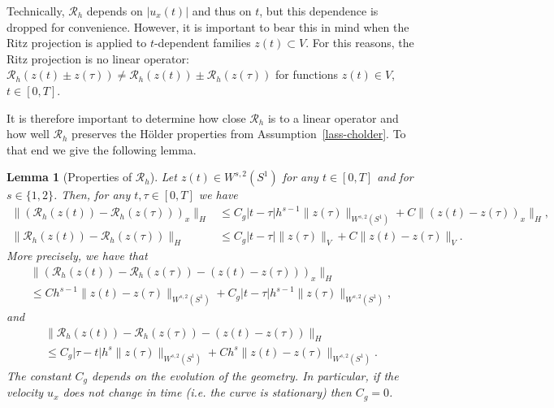 \documentclass[a4paper,10pt]{article}
\newtheorem{lemma}[cor]{Lemma}
\numberwithin{equation}{section}
\begin{document}
Technically, $\mathcal{R}_{h}$ depends on $|u_{x}(t)|$ and thus on $t$, but this dependence is dropped for convenience. However, it is important to bear this in mind when the Ritz projection is applied to $t$-dependent families $z(t) \subset V$. For this reasons, the Ritz projection is no linear operator: $\mathcal{R}_{h}(z(t) \pm z(\tau)) \neq \mathcal{R}_{h}(z(t)) \pm \mathcal{R}_{h}(z(\tau))$ for functions $z(t) \in V$, $t \in [0,T]$.

It is therefore important to determine how close $\mathcal{R}_{h}$ is to a linear operator and how well $\mathcal{R}_{h}$ preserves the H\"older properties from Assumption~\ref{lass-cholder}. To that end we give the following lemma.

\begin{lemma}[Properties of $\mathcal{R}_{h}$]
Let $z(t) \in W^{s,2}(S^{1})$ for any $t \in [0,T]$ and for $s \in \{ 1,2 \}$. Then, for any $t, \tau \in [0,T]$ we have
\begin{align}
\label{RH1}
 \| (\mathcal{R}_{h} (z(t)) -\mathcal{R}_{h} (z(\tau)) )_{x} \|_{H}& \leq C_{g} |t -\tau| h^{s-1}\| z(\tau)\|_{W^{s,2}(S^{1})} + C \| (z(t) -z(\tau) )_{x} \|_{H},\\
 \label{RH2}
 \| \mathcal{R}_{h} (z(t)) -\mathcal{R}_{h} (z(\tau)) \|_{H}& \leq C_{g} |t -\tau| \| z(\tau)\|_{V}+
 C\| z(t) -z(\tau) \|_{V}.
\end{align}
More precisely, we have that
\begin{multline}\label{RH3}
\| (\mathcal{R}_{h} (z(t)) -\mathcal{R}_{h} (z(\tau)) - (z(t) -z(\tau)) )_{x}\|_{H} \\
\leq Ch^{s-1}
\| z(t) -z(\tau)\|_{W^{s,2}(S^{1})} + C_{g} |t -\tau|h^{s-1}
\| z(\tau)\|_{W^{s,2}(S^{1})} ,
\end{multline}
and 
\begin{multline}\label{RH4}
\| \mathcal{R}_{h} (z(t)) -\mathcal{R}_{h} (z(\tau)) - (z(t) -z(\tau)) \|_{H} \\
 \leq C_{g}|\tau-t|h^{s}\| z(\tau)\|_{W^{s,2}(S^{1})} + Ch^{s}
\| z(t) -z(\tau)\|_{W^{s,2}(S^{1})} .
\end{multline}
The constant $C_{g}$ depends on the evolution of the geometry.
In particular, if the velocity $u_{x}$ does not change in time (i.e. the curve is stationary) then $C_{g}=0$.
\end{lemma}
\end{document}
